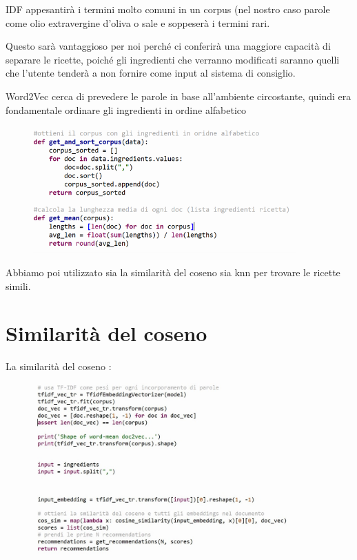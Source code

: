\documentclass[12pt]{report}
\begin{document}
IDF appesantirà i termini molto comuni in un corpus (nel nostro caso parole come olio extravergine d'oliva o sale e soppeserà i termini rari.

Questo sarà vantaggioso per noi perché ci conferirà una maggiore capacità di separare le ricette, poiché gli ingredienti che verranno modificati saranno quelli che l'utente tenderà a non fornire come input al sistema di consiglio.

Word2Vec cerca di prevedere le parole in base all'ambiente circostante, quindi era fondamentale ordinare gli ingredienti in ordine alfabetico

\begin{figure}[H]
        \centering
        {\includegraphics[width=0.9\textwidth]{img/img15.jpg}}
\end{figure}

Abbiamo poi utilizzato sia la similarità del coseno sia knn per trovare le ricette simili.

\section{Similarità del coseno}

La similarità del coseno : 

\begin{figure}[H]
        \centering
        {\includegraphics[width=0.9\textwidth]{img/img16.jpg}}
\end{figure}
\end{document}
